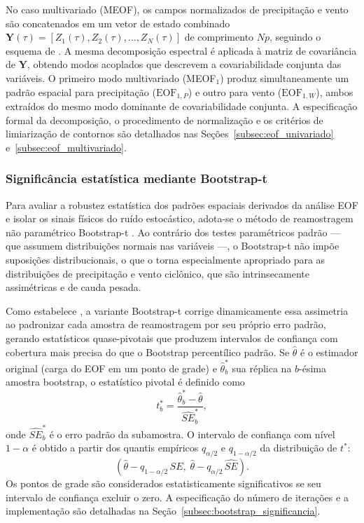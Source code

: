 No caso multivariado (MEOF), os campos normalizados de precipitação e vento são concatenados em um vetor de estado combinado $\mathbf{Y}(\tau) = [Z_1(\tau), Z_2(\tau), \dots, Z_N(\tau)]$ de comprimento $Np$, seguindo o esquema de \citet{bretherton1992intercomparison}.
A mesma decomposição espectral é aplicada à matriz de covariância de $\mathbf{Y}$, obtendo modos acoplados que descrevem a covariabilidade conjunta das variáveis.
O primeiro modo multivariado (MEOF$_1$) produz simultaneamente um padrão espacial para precipitação ($\text{EOF}_{1,P}$) e outro para vento ($\text{EOF}_{1,W}$), ambos extraídos do mesmo modo dominante de covariabilidade conjunta.
A especificação formal da decomposição, o procedimento de normalização e os critérios de limiarização de contornos são detalhados nas Seções~\ref{subsec:eof_univariado} e~\ref{subsec:eof_multivariado}.

\subsubsection{Significância estatística mediante Bootstrap-t}\label{subsubsec:tb_bootstrap}

Para avaliar a robustez estatística dos padrões espaciais derivados da análise EOF e isolar os sinais físicos do ruído estocástico, adota-se o método de reamostragem não paramétrico Bootstrap-t \citep{efron1993introduction}.
Ao contrário dos testes paramétricos padrão — que assumem distribuições normais nas variáveis —, o Bootstrap-t não impõe suposições distribucionais, o que o torna especialmente apropriado para as distribuições de precipitação e vento ciclônico, que são intrinsecamente assimétricas e de cauda pesada.

Como estabelece \citet{hesterberg2015bootstrap}, a variante Bootstrap-t corrige dinamicamente essa assimetria ao padronizar cada amostra de reamostragem por seu próprio erro padrão, gerando estatísticos quase-pivotais que produzem intervalos de confiança com cobertura mais precisa do que o Bootstrap percentílico padrão.
Se $\hat{\theta}$ é o estimador original (carga do EOF em um ponto de grade) e $\hat{\theta}^*_b$ sua réplica na $b$-ésima amostra bootstrap, o estatístico pivotal é definido como
\begin{equation}\label{eq:bootstrap_t}
t^*_b = \frac{\hat{\theta}^*_b - \hat{\theta}}{\widehat{SE}^*_b},
\end{equation}
onde $\widehat{SE}^*_b$ é o erro padrão da subamostra. O intervalo de confiança com nível $1-\alpha$ é obtido a partir dos quantis empíricos $q_{\alpha/2}$ e $q_{1-\alpha/2}$ da distribuição de $t^*$:
\begin{equation}\label{eq:bootstrap_ci}
\left(\hat{\theta} - q_{1-\alpha/2}\,\widehat{SE},\; \hat{\theta} - q_{\alpha/2}\,\widehat{SE}\right).
\end{equation}
Os pontos de grade são considerados estatisticamente significativos se seu intervalo de confiança excluir o zero. A especificação do número de iterações e a implementação são detalhadas na Seção~\ref{subsec:bootstrap_significancia}.